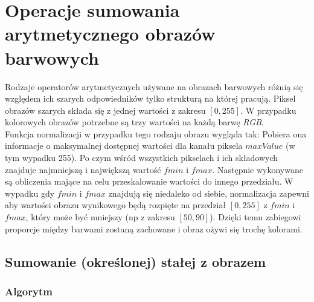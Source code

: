 \documentclass[a4paper,12pt]{book}
\begin{document}
\chapter{Operacje sumowania arytmetycznego obrazów barwowych}
Rodzaje operatorów arytmetycznych używane na obrazach barwowych różnią się względem ich szarych odpowiedników tylko strukturą na której pracują. Piksel obrazów szarych składa się z jednej wartości z zakresu $[0,255]$. W przypadku kolorowych obrazów potrzebne są trzy wartości na każdą barwę \textit{RGB}. 
\\
Funkcja normalizacji w przypadku tego rodzaju obrazu wygląda tak: 
Pobiera ona informacje o maksymalnej dostępnej wartości dla kanału piksela $maxValue$ (w tym wypadku 255). Po czym wśród wszystkich pikselach i ich składowych znajduje najmniejszą i największą wartość $fmin$ i $fmax$. Następnie wykonywane są obliczenia mające na celu przeskalowanie wartości do innego przedziału. W wypadku gdy $fmin$ i $fmax$ znajdują się niedaleko od siebie, normalizacja zapewni aby wartości obrazu wynikowego będą rozpięte na przedział $[0,255]$ z $fmin$ i $fmax$, który może być mniejszy (np z zakresu $[50,90]$). Dzięki temu zabiegowi proporcje między barwami zostaną zachowane i obraz ożywi się trochę kolorami. 

\section{Sumowanie (określonej) stałej z obrazem}
\subsection*{Algorytm}
\end{document}
